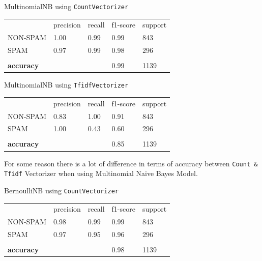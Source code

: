 MultinomialNB using \verb|CountVectorizer|
\begin{table}[H]
    \begin{tabular}{lllll}
        & precision & recall & f1-score                     & support \\
        NON-SPAM          & 1.00      & 0.99   & 0.99                         & 843     \\
        SPAM              & 0.97      & 0.99   & 0.98                         & 296     \\
        &           &        &                              &         \\
        \textbf{accuracy} &           &        & \cellcolor[HTML]{FFCCC9}0.99 & 1139
    \end{tabular}\label{tab:Multinomial_count_vect}
\end{table}

MultinomialNB using \verb|TfidfVectorizer|
\begin{table}[H]
    \begin{tabular}{lllll}
        & precision & recall & f1-score                     & support \\
        NON-SPAM          & 0.83      & 1.00   & 0.91                         & 843     \\
        SPAM              & 1.00      & 0.43   & 0.60                         & 296     \\
        &           &        &                              &         \\
        \textbf{accuracy} &           &        & \cellcolor[HTML]{FFCCC9}0.85 & 1139
    \end{tabular}\label{tab:Multinomial_tfidf_vect}
\end{table}
For some reason there is a lot of difference in terms of accuracy between \verb|Count & Tfidf| Vectorizer when
using Multinomial Naive Bayes Model.


BernoulliNB using \verb|CountVectorizer|
\begin{table}[H]
    \begin{tabular}{lllll}
        & precision & recall & f1-score                     & support \\
        NON-SPAM          & 0.98      & 0.99   & 0.99                         & 843     \\
        SPAM              & 0.97      & 0.95   & 0.96                         & 296     \\
        &           &        &                              &         \\
        \textbf{accuracy} &           &        & \cellcolor[HTML]{FFCCC9}0.98 & 1139
    \end{tabular}\label{tab:BernoulliNB_count_vect}
\end{table}

